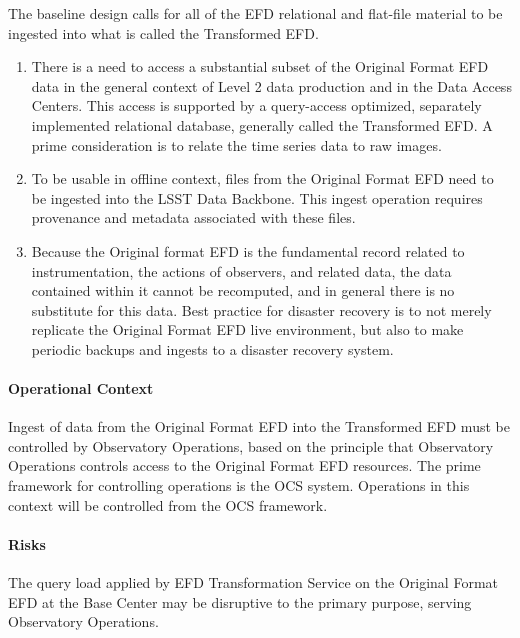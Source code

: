 The baseline design calls for all of the EFD relational
and flat-file material to be ingested into what is called the Transformed
EFD.

\begin{enumerate}

\item There is a need to access a substantial subset of the Original Format
EFD data in the general context of Level 2 data production and in the
Data Access Centers. This access is supported by a query-access
optimized, separately implemented relational database, generally
called the Transformed EFD. A prime consideration is to relate the
time series data to raw images.

\item To be usable in offline context, files from the Original Format EFD
need to be ingested into the LSST Data Backbone. This ingest operation
requires provenance and metadata associated with these files.

\item Because the Original format EFD is the fundamental record related to
instrumentation, the actions of observers, and related data, the data
contained within it cannot be recomputed, and in general there is no
substitute for this data. Best practice for disaster recovery is to
not merely replicate the Original Format EFD live environment, but also
to make periodic backups and ingests to a disaster recovery system.

\end{enumerate}

\paragraph{Operational Context}

Ingest of data from the Original Format EFD into the Transformed EFD
must be controlled by Observatory Operations, based on the principle
that Observatory Operations controls access to the Original Format EFD
resources. The prime framework for controlling operations is the OCS
system. Operations in this context will be controlled from the OCS
framework.

\paragraph{Risks}

The query load applied by EFD Transformation Service  on the Original Format
EFD at the Base Center may be disruptive to the primary purpose,
serving Observatory Operations.

